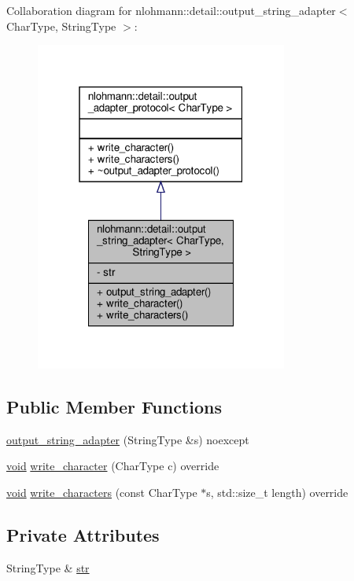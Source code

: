 Collaboration diagram for nlohmann\+:\+:detail\+:\+:output\+\_\+string\+\_\+adapter$<$ Char\+Type, String\+Type $>$\+:\nopagebreak
\begin{figure}[H]
\begin{center}
\leavevmode
\includegraphics[width=235pt]{classnlohmann_1_1detail_1_1output__string__adapter__coll__graph}
\end{center}
\end{figure}
\subsection*{Public Member Functions}
\begin{DoxyCompactItemize}
\item 
\hyperlink{classnlohmann_1_1detail_1_1output__string__adapter_af3a49ecd0d23fe56ac21e13d8752abc7}{output\+\_\+string\+\_\+adapter} (String\+Type \&s) noexcept
\item 
\hyperlink{namespacenlohmann_1_1detail_a59fca69799f6b9e366710cb9043aa77d}{void} \hyperlink{classnlohmann_1_1detail_1_1output__string__adapter_a2d76cc6c88ddbc196a63fcfcac9ee7d1}{write\+\_\+character} (Char\+Type c) override
\item 
\hyperlink{namespacenlohmann_1_1detail_a59fca69799f6b9e366710cb9043aa77d}{void} \hyperlink{classnlohmann_1_1detail_1_1output__string__adapter_ab5ea4da075305d225dfd84ad997e8747}{write\+\_\+characters} (const Char\+Type $\ast$s, std\+::size\+\_\+t length) override
\end{DoxyCompactItemize}
\subsection*{Private Attributes}
\begin{DoxyCompactItemize}
\item 
String\+Type \& \hyperlink{classnlohmann_1_1detail_1_1output__string__adapter_ae57cf7d5c5ec641e25860bb9fb8e6cb9}{str}
\end{DoxyCompactItemize}


